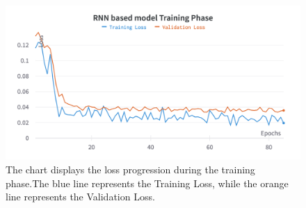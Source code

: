 \begin{figure}[H]
	\centering
	\includegraphics[width=\linewidth]{chapters/3_models/imgs/grrun/grruntraining.png}
	\caption{The chart displays the loss progression during the training phase.The blue line represents the Training Loss, while the orange line represents the Validation Loss.}
	\label{fig:grruntraining}
\end{figure}

